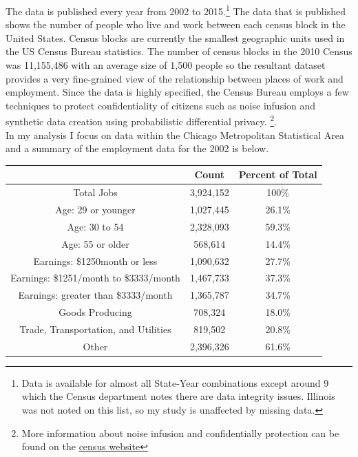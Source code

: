 \documentclass{article}
\theoremstyle{definition}
\theoremstyle{remark}
\newcommand\fnurl[2]{%
\href{#2}{#1}%
}
\begin{document}
The data is published every year from 2002 to 2015.\footnote{Data is available for almost all State-Year combinations except around 9 which the Census department notes there are data integrity issues.  Illinois was not noted on this list, so my study is unaffected by missing data.}  The data that is published shows the number of people who live and work between each census block in the United States.  Census blocks are currently the smallest geographic units used in the US Census Bureau statistics.  The number of census blocks in the 2010 Census was 11,155,486 with an average size of 1,500 people so the resultant dataset provides a very fine-grained view of the relationship between places of work and employment.  Since the data is highly specified, the Census Bureau employs a few techniques to protect confidentiality of citizens such as noise infusion and synthetic data creation using probabilistic differential privacy. \footnote{More information about noise infusion and confidentially protection can be found on the \fnurl{census website}{https://www2.census.gov/ces/wp/2014/CES-WP-14-30.pdf}}.\\

In my analysis I focus on data within the Chicago Metropolitan Statistical Area and a summary of the employment data for the 2002 is below. \\
\begin{center}
 \begin{tabular}{|| c | c | c||} 
 \hline
 & Count & Percent of Total \\[0.5ex] 
 \hline\hline
 Total Jobs & 3,924,152  & 100\% \\  \hline
 Age: 29 or younger & 1,027,445 & 26.1\% \\ 
 Age: 30 to 54 & 2,328,093 & 59.3\% \\
 Age: 55 or older & 568,614 & 14.4\% \\ \hline
 Earnings: \$1250month or less & 1,090,632 & 27.7\% \\ 
 Earnings: \$1251/month to \$3333/month  & 1,467,733 & 37.3\% \\ 
 Earnings: greater than \$3333/month & 1,365,787 & 34.7\% \\ \hline
 Goods Producing  & 708,324 & 18.0\% \\ 
 Trade, Transportation, and Utilities  & 819,502 & 20.8\% \\ 
 Other  & 2,396,326 & 61.6\% \\ \hline 
\end{tabular}
\end{center}
\end{document}
